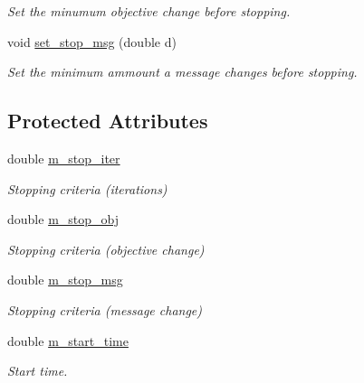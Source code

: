 \begin{DoxyCompactItemize}
\begin{DoxyCompactList}\small\item\em Set the minumum objective change before stopping. \end{DoxyCompactList}\item 
void \hyperlink{classmerlin_1_1algorithm_a9ec636be897b4ca62a3dc3bb493472e4}{set\+\_\+stop\+\_\+msg} (double d)
\begin{DoxyCompactList}\small\item\em Set the minimum ammount a message changes before stopping. \end{DoxyCompactList}\end{DoxyCompactItemize}
\subsection*{Protected Attributes}
\begin{DoxyCompactItemize}
\item 
\hypertarget{classmerlin_1_1algorithm_a292ad6727f86126574943414afcd4196}{}double \hyperlink{classmerlin_1_1algorithm_a292ad6727f86126574943414afcd4196}{m\+\_\+stop\+\_\+iter}\label{classmerlin_1_1algorithm_a292ad6727f86126574943414afcd4196}

\begin{DoxyCompactList}\small\item\em Stopping criteria (iterations) \end{DoxyCompactList}\item 
\hypertarget{classmerlin_1_1algorithm_afe10662910ee8c4349a17684fd799a9b}{}double \hyperlink{classmerlin_1_1algorithm_afe10662910ee8c4349a17684fd799a9b}{m\+\_\+stop\+\_\+obj}\label{classmerlin_1_1algorithm_afe10662910ee8c4349a17684fd799a9b}

\begin{DoxyCompactList}\small\item\em Stopping criteria (objective change) \end{DoxyCompactList}\item 
\hypertarget{classmerlin_1_1algorithm_a3ad7c9e3331f03f7010e466da2e951dd}{}double \hyperlink{classmerlin_1_1algorithm_a3ad7c9e3331f03f7010e466da2e951dd}{m\+\_\+stop\+\_\+msg}\label{classmerlin_1_1algorithm_a3ad7c9e3331f03f7010e466da2e951dd}

\begin{DoxyCompactList}\small\item\em Stopping criteria (message change) \end{DoxyCompactList}\item 
\hypertarget{classmerlin_1_1algorithm_a8102421ee6a9ccc1378a808540613a4b}{}double \hyperlink{classmerlin_1_1algorithm_a8102421ee6a9ccc1378a808540613a4b}{m\+\_\+start\+\_\+time}\label{classmerlin_1_1algorithm_a8102421ee6a9ccc1378a808540613a4b}

\begin{DoxyCompactList}\small\item\em Start time. \end{DoxyCompactList}\end{DoxyCompactItemize}


